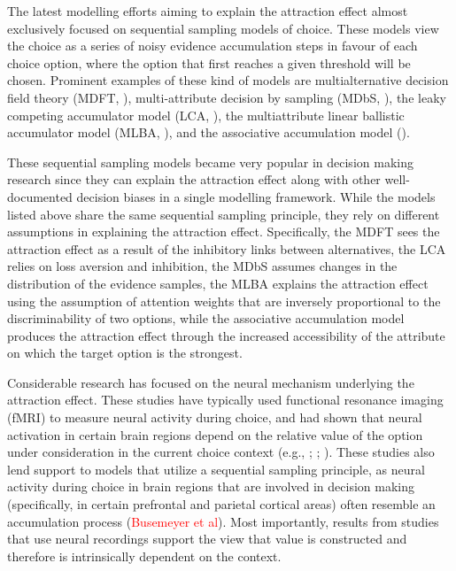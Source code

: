 \documentclass[11pt,a4paper]{article}
\begin{document}
The latest modelling efforts aiming to explain the attraction effect almost exclusively focused on sequential sampling models of choice. These models view the choice as a series of noisy evidence accumulation steps in favour of each choice option, where the option that first reaches a given threshold will be chosen. Prominent examples of these kind of models are multialternative decision field theory (MDFT, ), multi-attribute decision by sampling (MDbS, ), the leaky competing accumulator model (LCA, ), the multiattribute linear ballistic accumulator model (MLBA, ), and the associative accumulation model (). 

These sequential sampling models became very popular in decision making research since they can explain the attraction effect along with other well-documented decision biases in a single modelling framework. While the models listed above share the same sequential sampling principle, they rely on different assumptions in explaining the attraction effect. Specifically, the MDFT sees the attraction effect as a result of the inhibitory links between alternatives, the LCA relies on loss aversion and inhibition, the MDbS assumes changes in the distribution of the evidence samples, the MLBA explains the attraction effect using the assumption of attention weights that are inversely proportional to the discriminability of two options, while the associative accumulation model produces the attraction effect through the increased accessibility of the attribute on which the target option is the strongest.

Considerable research has focused on the neural mechanism underlying the attraction effect. These studies have typically used functional resonance imaging (fMRI) to measure neural activity during choice, and had shown that neural activation in certain brain regions depend on the relative value of the option under consideration in the current choice context (e.g., ; ; ). These studies also lend support to models that utilize a sequential sampling principle, as neural activity during choice in brain regions that are involved in decision making (specifically, in certain prefrontal and parietal cortical areas) often resemble an accumulation process (\textcolor{red}{Busemeyer et al}). Most importantly, results from studies that use neural recordings support the view that value is constructed and therefore is intrinsically dependent on the context.
\end{document}
